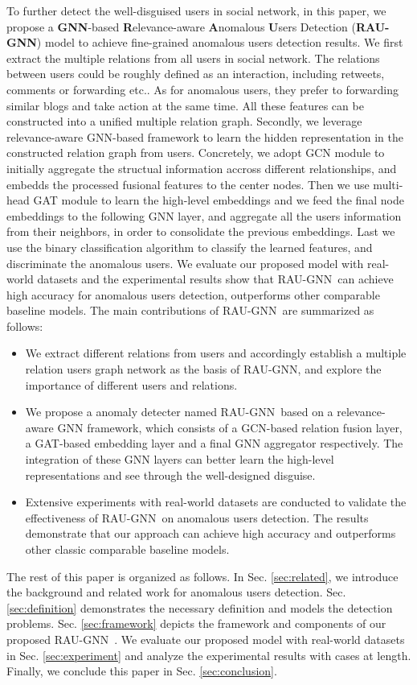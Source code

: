 \documentclass[conference]{IEEEtran}
\theoremstyle{definition}
\newcommand{\model}{\textsc{RAU-GNN}}
\begin{document}
To further detect the well-disguised users in social network, in this paper, we propose a \textbf{GNN}-based \textbf{R}elevance-aware \textbf{A}nomalous \textbf{U}sers Detection (\textbf{\model}) model to achieve fine-grained anomalous users detection results.
We first extract the multiple relations from all users in social network. The relations between users could be roughly defined as an interaction, including retweets, comments or forwarding etc.\cite{peng2021streaming}. As for anomalous users, they prefer to forwarding similar blogs and take action at the same time. All these features can be constructed into a unified multiple relation graph.
Secondly, we leverage relevance-aware GNN-based framework to learn the hidden representation in the constructed relation graph from users. 
Concretely, we adopt GCN module to initially aggregate the structual information accross different relationships, and embedds the processed fusional features to the center nodes. 
Then we use multi-head GAT module to learn the high-level embeddings and we feed the final node embeddings to the following GNN layer, and aggregate all the users information from their neighbors, in order to consolidate the previous embeddings.  
Last we use the binary classification algorithm to classify the learned features, and discriminate the anomalous users.
We evaluate our proposed model with real-world datasets and the experimental results show that \model~can achieve high accuracy for anomalous users detection, outperforms other comparable baseline models. The main contributions of \model~are summarized as follows:
\begin{itemize}
    \item We extract different relations from users and accordingly establish a multiple relation users graph network as the basis of \model, and explore the importance of different users and relations.
    \item We propose a anomaly detecter named \model~based on a relevance-aware GNN framework, which consists of a GCN-based relation fusion layer, a GAT-based embedding layer and a final GNN aggregator respectively. The integration of these GNN layers can better learn the high-level representations and see through the well-designed disguise.
    \item Extensive experiments with real-world datasets are conducted to validate the effectiveness of \model~on anomalous users detection. The results demonstrate that our approach can achieve high accuracy and outperforms other classic comparable baseline models.
\end{itemize}
The rest of this paper is organized as follows. In Sec. \ref{sec:related}, we introduce the background and related work for anomalous users detection. Sec. \ref{sec:definition} demonstrates the necessary definition and models the detection problems. Sec. \ref{sec:framework} depicts the framework and components of our proposed \model~. We evaluate our proposed model with real-world datasets in Sec. \ref{sec:experiment} and analyze the experimental results with cases at length. Finally, we conclude this paper in Sec. \ref{sec:conclusion}.
\end{document}
